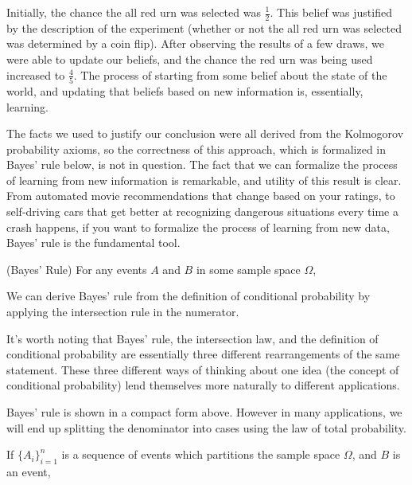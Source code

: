\par
Initially, the chance the all red urn was selected was $\frac{1}{2}$. This belief was justified by the description of the experiment (whether or not the all red urn was selected was determined by a coin flip). After observing the results of a few draws, we were able to update our beliefs, and the chance the red urn was being used increased to $\frac{4}{5}$. The process of starting from some belief about the state of the world, and updating that beliefs based on new information is, essentially, learning.
\par
The facts we used to justify our conclusion were all derived from the Kolmogorov probability axioms, so the correctness of this approach, which is formalized in Bayes' rule below, is not in question. The fact that we can formalize the process of learning from new information is remarkable, and utility of this result is clear. From automated movie recommendations that change based on your ratings, to self-driving cars that get better at recognizing dangerous situations every time a crash happens, if you want to formalize the process of learning from new data, Bayes' rule is the fundamental tool.
\par
\begin{thm}\label{BayesRule}
(Bayes' Rule) For any events $A$ and $B$ in some sample space $\Omega$,
\end{thm}
\par
\begin{pf} We can derive Bayes' rule from the definition of conditional probability by applying the intersection rule in the numerator.
\end{pf}
\par
It's worth noting that Bayes' rule, the intersection law, and the definition of conditional probability are essentially three different rearrangements of the same statement. These three different ways of thinking about one idea (the concept of conditional probability) lend themselves more naturally to different applications.
\par
Bayes' rule is shown in a compact form above. However in many applications, we will end up splitting the denominator into cases using the law of total probability.
\begin{cor}If $\{A_i\}_{i=1}^n$ is a sequence of events which partitions the sample space $\Omega$, and $B$ is an event,
\end{cor}
